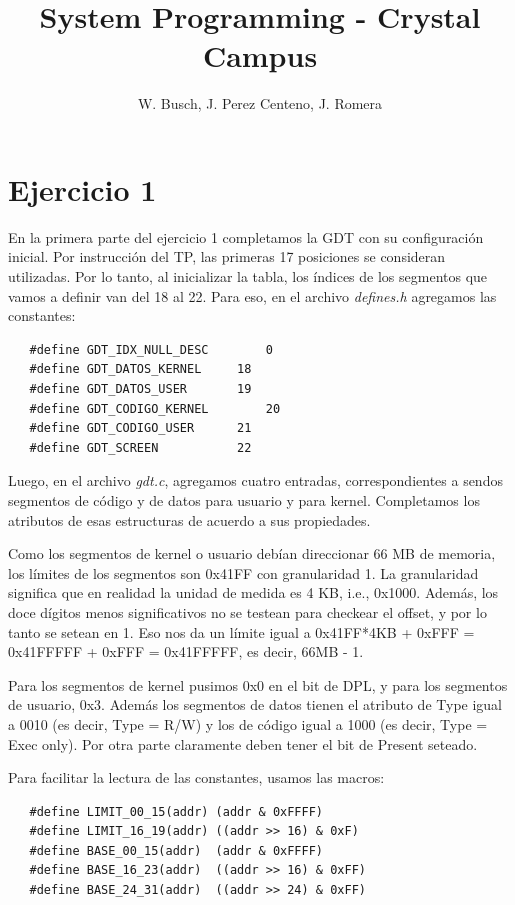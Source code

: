 \documentclass[a4paper]{article}
\title{System Programming - Crystal Campus}
\author{W. Busch, J. Perez Centeno, J. Romera}
\newenvironment{codesnippet}{%
	\begin{Sbox}\begin{minipage}{\textwidth}\sffamily\small}%
	{\end{minipage}\end{Sbox}%
		\begin{center}%
		\vspace{-0.4cm}\colorbox{litegrey}{\TheSbox}\end{center}\vspace{0.3cm}}
\begin{document}
\maketitle
\tableofcontents

\section{Ejercicio 1}

En la primera parte del ejercicio 1 completamos la GDT con su configuración inicial. Por instrucción del TP, las
primeras 17 posiciones se consideran utilizadas. Por lo tanto, al inicializar la tabla, los índices de los segmentos que
vamos a definir van del 18 al 22. Para eso, en el archivo \textit{defines.h} agregamos las constantes:

\begin{codesnippet}
  \begin{verbatim}
   #define GDT_IDX_NULL_DESC		0
   #define GDT_DATOS_KERNEL		18
   #define GDT_DATOS_USER		19
   #define GDT_CODIGO_KERNEL		20
   #define GDT_CODIGO_USER		21
   #define GDT_SCREEN			22
  \end{verbatim}
\end{codesnippet}

Luego, en el archivo \textit{gdt.c}, agregamos cuatro entradas, correspondientes a sendos segmentos de código y de datos
para usuario y para kernel. Completamos los atributos de esas estructuras de acuerdo a sus propiedades.

Como los segmentos de kernel o usuario debían direccionar 66 MB de memoria, los límites de los segmentos son 0x41FF con
granularidad 1. La granularidad significa que en realidad la unidad de medida es 4 KB, i.e., 0x1000. Además, los doce
dígitos menos significativos no se testean para checkear el offset, y por lo tanto se setean en 1. Eso nos da un límite
igual a 0x41FF*4KB + 0xFFF  = 0x41FFFFF + 0xFFF = 0x41FFFFF, es decir, 66MB - 1.

Para los segmentos de kernel pusimos 0x0 en el bit de DPL, y para los segmentos de usuario, 0x3. Además los segmentos de
datos tienen el atributo de Type igual a 0010 (es decir, Type = R/W) y los de código igual a 1000 (es decir, Type = Exec
only). Por otra parte claramente deben tener el bit de Present seteado.

Para facilitar la lectura de las constantes, usamos las macros:

\begin{codesnippet}
  \begin{verbatim}
   #define LIMIT_00_15(addr) (addr & 0xFFFF)
   #define LIMIT_16_19(addr) ((addr >> 16) & 0xF)
   #define BASE_00_15(addr)  (addr & 0xFFFF)
   #define BASE_16_23(addr)  ((addr >> 16) & 0xFF)
   #define BASE_24_31(addr)  ((addr >> 24) & 0xFF)
  \end{verbatim}
\end{codesnippet}
\end{document}
